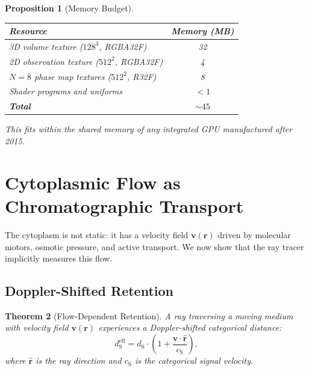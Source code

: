 \documentclass[11pt,twocolumn,a4paper]{article}
\newtheorem{theorem}{Theorem}[section]
\newtheorem{proposition}[theorem]{Proposition}
\newcommand{\dS}{d_{\mathrm{S}}}
\newcommand{\cS}{c_{\mathrm{S}}}
\begin{document}
\begin{proposition}[Memory Budget]
\label{prop:memory-budget}
\begin{center}
\small
\begin{tabular}{@{}lc@{}}
\toprule
\textbf{Resource} & \textbf{Memory (MB)} \\
\midrule
3D volume texture ($128^3$, RGBA32F) & 32 \\
2D observation texture ($512^2$, RGBA32F) & 4 \\
$N=8$ phase map textures ($512^2$, R32F) & 8 \\
Shader programs and uniforms & $<\!1$ \\
\midrule
\textbf{Total} & $\sim\!45$ \\
\bottomrule
\end{tabular}
\end{center}
This fits within the shared memory of any integrated GPU manufactured
after 2015.
\end{proposition}




\section{Cytoplasmic Flow as Chromatographic Transport}
\label{sec:cytoplasmic-flow}

The cytoplasm is not static: it has a velocity field
$\mathbf{v}(\mathbf{r})$ driven by molecular motors, osmotic
pressure, and active transport. We now show that the ray tracer
implicitly measures this flow.

\subsection{Doppler-Shifted Retention}

\begin{theorem}[Flow-Dependent Retention]
\label{thm:flow-retention}
A ray traversing a moving medium with velocity field
$\mathbf{v}(\mathbf{r})$ experiences a Doppler-shifted categorical
distance:
\begin{equation}
\dS^{\mathrm{eff}} = \dS \cdot \left(1 +
  \frac{\mathbf{v} \cdot \hat{\mathbf{r}}}{\cS}\right),
\label{eq:doppler-retention}
\end{equation}
where $\hat{\mathbf{r}}$ is the ray direction and $\cS$ is the
categorical signal velocity.
\end{theorem}
\end{document}
